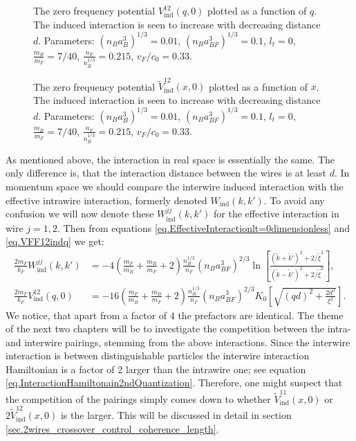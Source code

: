 \begin{figure} 
\begin{center}  
  
\caption{The zero frequency potential $V_{\text{ind}}^{12}(q,0)$ plotted as a function of $q$. The induced interaction is seen to increase with decreasing distance $d$. Parameters: $(n_Ba_B^3)^{1/3} = 0.01$, $(n_Ba_{BF}^3)^{1/3} = 0.1$, $l_t = 0$, $\frac{m_B}{m_F} = 7/40$, $\frac{n_F}{n_B^{1/3}} = 0.215$, $v_F/c_0 = 0.33$.}  
\label{fig.VFF12indq}
\end{center}
\end{figure}

\begin{figure}
\begin{center}
  
\caption{The zero frequency potential $\tilde{V}_{\text{ind}}^{12}(x,0)$ plotted as a function of $x$. The induced interaction is seen to increase with decreasing distance $d$. Parameters: $(n_Ba_B^3)^{1/3} = 0.01$, $(n_Ba_{BF}^3)^{1/3} = 0.1$, $l_t = 0$, $\frac{m_B}{m_F} = 7/40$, $\frac{n_F}{n_B^{1/3}} = 0.215$, $v_F/c_0 = 0.33$.}  
\label{fig.VFF12indx}  
\end{center}    
\end{figure}

As mentioned above, the interaction in real space is essentially the same. The only difference is, that the interaction distance between the wires is at least $d$. In momentum space we should compare the interwire induced interaction with the effective intrawire interaction, formerly denoted $W_{\text{ind}}(k,k')$. To avoid any confusion we will now denote these $W_{\text{ind}}^{jj}(k,k')$ for the effective interaction in wire $j = 1, 2$. Then from equations \eqref{eq.EffectiveInteractionlt=0dimensionless} and \eqref{eq.VFF12indq} we get:
\begin{align}
\frac{2m_F}{k_F} W_{\text{ind}}^{jj}(k,k') &= - 4\left( \frac{m_F}{m_B} + \frac{m_B}{m_F} + 2 \right) \frac{n_B^{1/3}}{n_F}(n_Ba_{BF}^3)^{2/3} \ln\left[\frac{(\tilde{k}+\tilde{k}')^2+2/\tilde{\xi}^2}{(\tilde{k}-\tilde{k}')^2+2/\tilde{\xi}^2}\right], \nonumber \\
\frac{2m_F}{k_F} V_{\text{ind}}^{12}(q,0) &= - 16\left( \frac{m_F}{m_B} + \frac{m_B}{m_F} + 2 \right) \frac{n_B^{1/3}}{n_F}(n_Ba_{BF}^3)^{2/3}K_0\left[\sqrt{(qd)^2+\frac{2d^2}{\xi^2}}\right].
\end{align}
We notice, that apart from a factor of $4$ the prefactors are identical. The theme of the next two chapters will be to investigate the competition between the intra- and interwire pairings, stemming from the above interactions. Since the interwire interaction is between distinguishable particles the interwire interaction Hamiltonian is a factor of 2 larger than the intrawire one; see equation \eqref{eq.InteractionHamiltonain2ndQuantization}. Therefore, one might suspect that the competition of the pairings simply comes down to whether $\tilde{V}_{\text{ind}}^{11}(x,0)$ or $2\tilde{V}_{\text{ind}}^{12}(x,0)$ is the larger. This will be discussed in detail in section \ref{sec.2wires_crossover_control_coherence_length}. 




